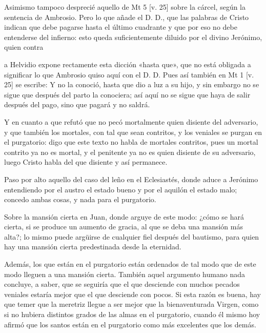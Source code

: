 Asimismo tampoco desprecié aquello de Mt 5 [v. 25] sobre la cárcel, según la sentencia de Ambrosio. Pero lo que añade el D. D., que las palabras de Cristo indican que debe pagarse hasta el último cuadrante y que por eso no debe entenderse del infierno: esto queda suficientemente diluido por el divino Jerónimo, quien contra

a Helvidio expone rectamente esta dicción «hasta que», que no está obligada a significar lo que Ambrosio quiso aquí con el D. D. Pues así también en Mt 1 [v. 25] se escribe: Y no la conoció, hasta que dio a luz a su hijo, y sin embargo no se sigue que después del parto la conociera; así aquí no se sigue que haya de salir después del pago, sino que pagará y no saldrá.

Y en cuanto a que refutó que no pecó mortalmente quien disiente del adversario, y que también los mortales, con tal que sean contritos, y los veniales se purgan en el purgatorio: digo que este texto no habla de mortales contritos, pues un mortal contrito ya no es mortal, y el penitente ya no es quien disiente de su adversario, luego Cristo habla del que disiente y así permanece.

Paso por alto aquello del caso del leño en el Eclesiastés, donde aduce a Jerónimo entendiendo por el austro el estado bueno y por el aquilón el estado malo; concedo ambas cosas, y nada para el purgatorio.

Sobre la mansión cierta en Juan, donde arguye de este modo: ¿cómo se hará cierta, si se produce un aumento de gracia, al que se deba una mansión más alta?; lo mismo puede argüirse de cualquier fiel después del bautismo, para quien hay una mansión cierta predestinada desde la eternidad.

Además, los que están en el purgatorio están ordenados de tal modo que de este modo lleguen a una mansión cierta. También aquel argumento humano nada concluye, a saber, que se seguiría que el que desciende con muchos pecados veniales estaría mejor que el que desciende con pocos. Si esta razón es buena, hay que temer que la meretriz llegue a ser mejor que la bienaventurada Virgen, como si no hubiera distintos grados de las almas en el purgatorio, cuando él mismo hoy afirmó que los santos están en el purgatorio como más excelentes que los demás.

